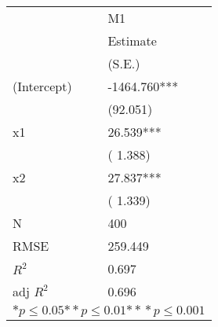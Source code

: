 \begin{tabular}{*{2}{l}}
\hline
                  & M1   \tabularnewline
                   &Estimate \tabularnewline
                 &(S.E.) \tabularnewline
 \hline
 \hline
   (Intercept)     &-1464.760*** \tabularnewline
                 &(92.051)  \tabularnewline
   x1              &26.539*** \tabularnewline
                 &( 1.388)  \tabularnewline
   x2              &27.837*** \tabularnewline
                 &( 1.339)  \tabularnewline
 \hline
 N                 &400       \tabularnewline
 RMSE             &259.449   \tabularnewline
 $R^2$             &0.697   \tabularnewline
 adj $R^2$         &0.696   \tabularnewline
 \hline
\hline
 
 \multicolumn{2}{c}{${*  p}\le 0.05$${*\!\!*  p}\le 0.01$${*\!\!*\!\!*  p}\le 0.001$}\tabularnewline
 \end{tabular}
